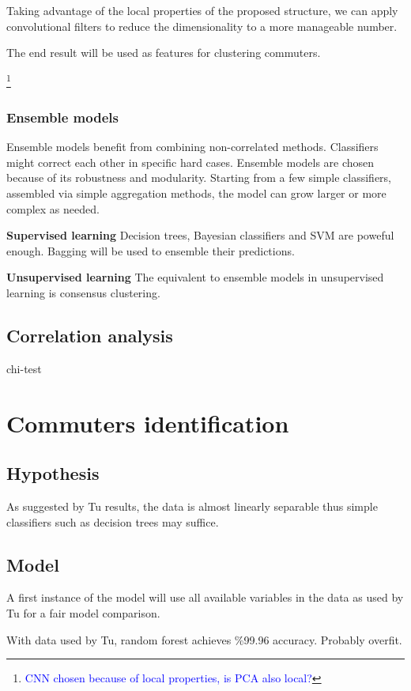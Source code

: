 \documentclass{article}
\newcommand{\technicalDoubt}[1]{\footnote{\textcolor{blue}{#1}}}
\begin{document}
Taking advantage of the local properties of the proposed structure, we can apply convolutional filters to reduce the dimensionality to a more manageable number. 

The end result will be used as features for clustering commuters. 

\technicalDoubt{CNN chosen because of local properties, is PCA also local?}

\subsubsection{Ensemble models}
Ensemble models benefit from combining non-correlated methods. Classifiers might correct each other in specific hard cases. Ensemble models are chosen because of its robustness and modularity. Starting from a few simple classifiers, assembled via simple aggregation methods, the model can grow larger or more complex as needed.

\textbf{Supervised learning}
Decision trees, Bayesian classifiers and SVM are poweful enough. Bagging will be used to ensemble their predictions.

\textbf{Unsupervised learning}
The equivalent to ensemble models in unsupervised learning is consensus clustering.


\subsection{Correlation analysis}
chi-test


\newpage
\section{Commuters identification}
\label{sec:partI}
\subsection{Hypothesis}
As suggested by Tu \cite{tu2016impact} results, the data is almost linearly separable thus simple classifiers such as decision trees may suffice. 


\subsection{Model}
A first instance of the model will use all available variables in the data as used by Tu \cite{tu2016impact} for a fair model comparison. 

With data used by Tu\cite{tu2016impact}, random forest achieves \%99.96 accuracy. Probably overfit.
\end{document}
